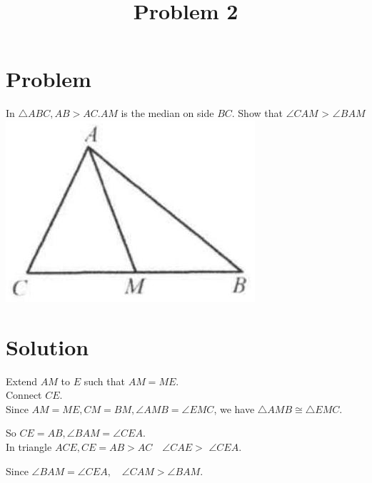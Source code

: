 \documentclass{article}
\title{Problem 2}
\date{}
\begin{document}
\maketitle

\section*{Problem}
In \(\triangle A B C, A B>A C . A M\) is the median on side \(B C\). Show that \(\angle C A M\) > \(\angle B A M\)\\
\centering
\includegraphics[width=\textwidth]{images/027.jpg}

\section*{Solution}
Extend \(A M\) to \(E\) such that \(A M=M E\).\\
Connect \(C E\).\\
Since \(A M=M E, C M=B M, \angle A M B=\angle E M C\), we have \(\triangle A M B \cong \triangle E M C\).

So \(C E=A B, \angle B A M=\angle C E A\).\\
In triangle \(A C E, C E=A B>A C \quad \angle C A E>\) \(\angle C E A\).

Since \(\angle B A M=\angle C E A, \quad \angle C A M>\angle B A M\).
\end{document}
